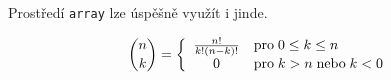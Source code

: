 \documentclass[twocolumn,11pt,a4paper]{article}
\begin{document}
\bigskip

Prostředí \verb=array= lze úspěšně využít i jinde.


$$\mathrm{\binom{\mathnormal{n}}{\mathnormal{k}}} = \left\{ 
    \begin{array}{c l}
        \frac{n!}{k!(n-k)!} & \textup{pro\;0} \leq k \leq n \\
        0 & \textup{pro}\;k > n\;\textup{nebo}\;k < 0
    \end{array} \right.$$
\end{document}
